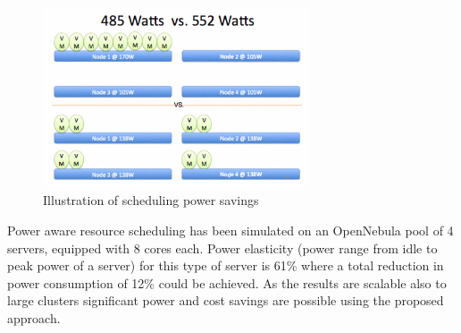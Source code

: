 
\begin{figure}[htbp]
	\centering
		\includegraphics[width=0.7\textwidth]{figures/state_of_the_art/server_power_consumption.PNG}
	\caption{Illustration of scheduling power savings \cite{younge2010efficient}}
	\label{fig:server_power_consumption}
\end{figure}

Power aware resource scheduling has been simulated on an OpenNebula \cite{fontan2008opennebula} pool of 4 servers, equipped with 8 cores each. Power elasticity (power range from idle to peak power of a server) for this type of server is 61\% where a total reduction in power consumption of 12\% could be achieved. As the results are scalable also to large clusters significant power and cost savings are possible using the proposed approach. 


%
%
%
%



